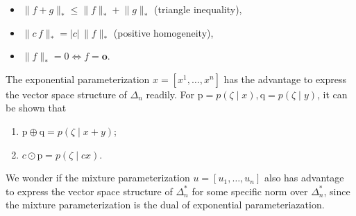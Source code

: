 \documentclass{amsart}
\theoremstyle{plain}
\theoremstyle{definition}
\theoremstyle{remark}
\begin{document}
\begin{itemize}
	\item $\lVert f+g \rVert_{*}\leq\lVert f \rVert_{*}+\lVert g \rVert_{*}$ (triangle inequality),
	\item $\lVert c\,f \rVert_{*}=|c|\,\lVert f \rVert_{*}$ (positive homogeneity),
	\item $\lVert f \rVert_{*}=0\iff f=\mathbf{o}$.
\end{itemize}

The exponential parameterization $x=[x^{1},\dots,x^{n}]$ has the advantage to express the vector space structure of $\Delta _n$ readily. For $\mathrm{p}=p(\zeta \mid x), \mathrm{q}=p(\zeta \mid y)$, it can be shown that

\begin{enumerate}
	\item $\mathrm{p} \oplus \mathrm{q}=p(\zeta \mid x+y)$;
	\item $c \odot \mathrm{p}=p(\zeta \mid c x)$.
\end{enumerate}

We wonder if the mixture parameterization $u=[u_1,\dots,u_n]$ also has advantage to express the vector space structure of $\Delta _n^{*}$ for some specific norm over $\Delta _n^{*}$, since the mixture parameterization is the dual of exponential parameteriazation.
\end{document}
